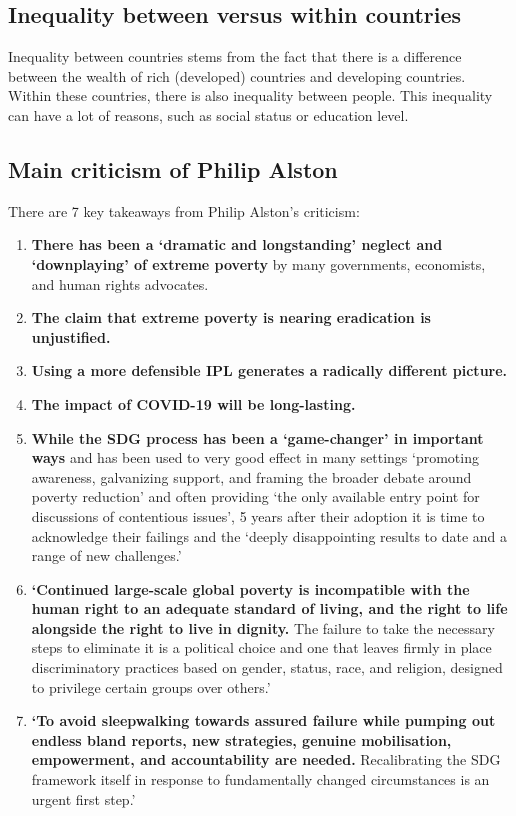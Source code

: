 \documentclass[../summary.tex]{subfiles}
\begin{document}
\subsection{Inequality between versus within countries}

Inequality between countries stems from the fact that there is a difference between the wealth of rich (developed) countries and developing countries. Within these countries, there is also inequality between people. This inequality can have a lot of reasons, such as social status or education level.

\subsection{Main criticism of Philip Alston}

There are 7 key takeaways from Philip Alston's criticism:
\begin{enumerate}
	\item \textbf{There has been a `dramatic and longstanding' neglect and `downplaying' of extreme poverty} by many governments, economists, and human rights advocates.
	\item \textbf{The claim that extreme poverty is nearing eradication is unjustified.}
	\item \textbf{Using a more defensible IPL generates a radically different picture.}
	\item \textbf{The impact of COVID-19 will be long-lasting.}
	\item \textbf{While the SDG process has been a `game-changer' in important ways} and has been used to very good effect in many settings `promoting awareness, galvanizing support, and framing the broader debate around poverty reduction' and often providing `the only available entry point for discussions of contentious issues', 5 years after their adoption it is time to acknowledge their failings and the `deeply disappointing results to date and a range of new challenges.'
	\item \textbf{`Continued large-scale global poverty is incompatible with the human right to an adequate standard of living, and the right to life alongside the right to live in dignity.} The failure to take the necessary steps to eliminate it is a political choice and one that leaves firmly in place discriminatory practices based on gender, status, race, and religion, designed to privilege certain groups over others.'
	\item \textbf{`To avoid sleepwalking towards assured failure while pumping out endless bland reports, new strategies, genuine mobilisation, empowerment, and accountability are needed.} Recalibrating the SDG framework itself in response to fundamentally changed circumstances is an urgent first step.'
\end{enumerate}
\end{document}
